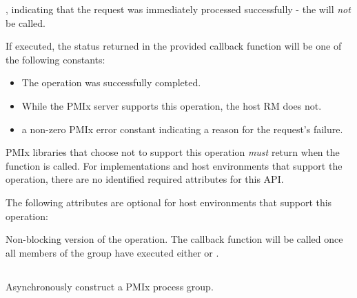 \returnsimplenb

\returnstart
\begin{constantdesc}
\item {}, indicating that the request was immediately processed successfully - the  will \textit{not} be called.
\end{constantdesc}
\returnend

If executed, the status returned in the provided callback function will be one of the following constants:

\begin{itemize}
\item {} The operation was successfully completed.
\item {} While the \ac{PMIx} server supports this operation, the host \ac{RM} does not.
\item a non-zero \ac{PMIx} error constant indicating a reason for the request's failure.
\end{itemize}

\reqattrstart
\ac{PMIx} libraries that choose not to support this operation \textit{must} return  when the function is called. For implementations and host environments that support the operation, there are no identified required
attributes for this \ac{API}.
\reqattrend

\optattrstart
The following attributes are optional for host environments that support this operation:


\optattrend

\descr

Non-blocking version of the  operation. The callback function will be called once all members of the group have executed either  or .

\subsection{}

\summary

Asynchronously construct a \ac{PMIx} process group.

\format


